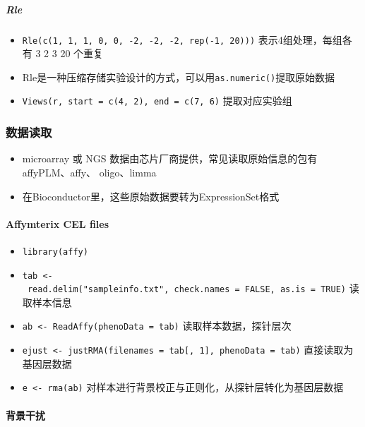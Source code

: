 \documentclass[]{book}
\providecommand{\tightlist}{%
  \setlength{\itemsep}{0pt}\setlength{\parskip}{0pt}}
\let\oldparagraph\paragraph
\renewcommand{\paragraph}[1]{\oldparagraph{#1}\mbox{}}
\let\oldsubparagraph\subparagraph
\renewcommand{\subparagraph}[1]{\oldsubparagraph{#1}\mbox{}}
\begin{document}
\hypertarget{rle}{%
\subparagraph{Rle}\label{rle}}

\begin{itemize}
\tightlist
\item
  \texttt{Rle(c(1,\ 1,\ 1,\ 0,\ 0,\ -2,\ -2,\ -2,\ rep(-1,\ 20)))} 表示4组处理，每组各有 3 2 3 20 个重复
\item
  Rle是一种压缩存储实验设计的方式，可以用\texttt{as.numeric()}提取原始数据
\item
  \texttt{Views(r,\ start\ =\ c(4,\ 2),\ end\ =\ c(7,\ 6)} 提取对应实验组
\end{itemize}

\subsubsection{数据读取}

\begin{itemize}
\tightlist
\item
  microarray 或 NGS 数据由芯片厂商提供，常见读取原始信息的包有affyPLM、affy、 oligo、limma
\item
  在Bioconductor里，这些原始数据要转为ExpressionSet格式
\end{itemize}

\hypertarget{affymterix-cel-files}{%
\paragraph{Affymterix CEL files}\label{affymterix-cel-files}}

\begin{itemize}
\tightlist
\item
  \texttt{library(affy)}
\item
  \texttt{tab\ \textless{}-\ read.delim("sampleinfo.txt",\ check.names\ =\ FALSE,\ as.is\ =\ TRUE)} 读取样本信息
\item
  \texttt{ab\ \textless{}-\ ReadAffy(phenoData\ =\ tab)} 读取样本数据，探针层次
\item
  \texttt{ejust\ \textless{}-\ justRMA(filenames\ =\ tab{[},\ 1{]},\ phenoData\ =\ tab)} 直接读取为基因层数据
\item
  \texttt{e\ \textless{}-\ rma(ab)} 对样本进行背景校正与正则化，从探针层转化为基因层数据
\end{itemize}

\paragraph{背景干扰}
\end{document}
